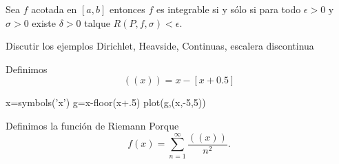 \begin{teorema} Sea $f$ acotada en $[a,b]$ entonces $f$ es integrable si y sólo si  para todo $\epsilon>0$ y $\sigma>0$ existe $\delta>0$ talque $R(P,f,\sigma)<\epsilon$.
\end{teorema}

\begin{ejemplo} Discutir los ejemplos Dirichlet, Heavside, Continuas, escalera discontinua
 
\end{ejemplo}

\begin{ejemplo} Definimos
\[
 ((x))=x-[x+0.5]
\]

\begin{sympyverbatim}
x=symbols('x')
g=x-floor(x+.5)
plot(g,(x,-5,5))
\end{sympyverbatim}
Definimos la función de Riemann Porque
\[
 f(x)=\sum_{n=1}^{\infty}\frac{((x))}{n^2}.
\]


\end{ejemplo}
